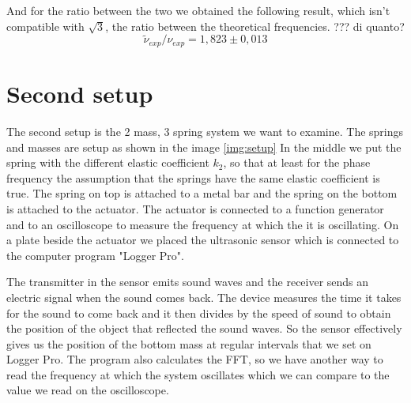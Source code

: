 \documentclass{article}
\begin{document}
And for the ratio between the two we obtained the following result, which isn't compatible with $\sqrt 3$, the ratio between the theoretical frequencies. ??? di quanto?
\begin{equation}
    \tilde \nu_{exp} / \nu_{exp} = 1,823 \pm 0,013
\end{equation}

\section{Second setup} \label{sec:setup2}
The second setup is the 2 mass, 3 spring system we want to examine. The springs and masses are setup as shown in the image \ref{img:setup}
In the middle we put the spring with the different elastic coefficient $k_2$, so that at least for the phase frequency the assumption that the springs have the same elastic coefficient is true. 
The spring on top is attached to a metal bar and the spring on the bottom is attached to the actuator. The actuator is connected to a function generator and to an oscilloscope to measure the frequency at which the it is oscillating. On a plate beside the actuator we placed the ultrasonic sensor which is connected to the computer program "Logger Pro". 

The transmitter in the sensor emits sound waves and the receiver sends an electric signal when the sound comes back. The device measures the time it takes for the sound to come back and it then divides by the speed of sound to obtain the position of the object that reflected the sound waves. So the sensor effectively gives us the position of the bottom mass at regular intervals that we set on Logger Pro. The program also calculates the FFT, so we have another way to read the frequency at which the system oscillates which we can compare to the value we read on the oscilloscope. 

\end{document}
